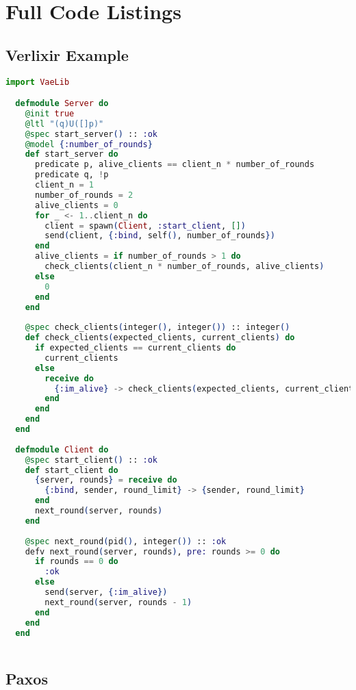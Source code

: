 \appendix \label{app:code}
\chapter{Full Code Listings}
\section{Verlixir Example}
\begin{lstlisting}[language=Elixir, xleftmargin=.1\linewidth]
  import VaeLib

  defmodule Server do
    @init true
    @ltl "(q)U([]p)"
    @spec start_server() :: :ok
    @model {:number_of_rounds}
    def start_server do
      predicate p, alive_clients == client_n * number_of_rounds
      predicate q, !p
      client_n = 1
      number_of_rounds = 2
      alive_clients = 0
      for _ <- 1..client_n do
        client = spawn(Client, :start_client, [])
        send(client, {:bind, self(), number_of_rounds})
      end
      alive_clients = if number_of_rounds > 1 do
        check_clients(client_n * number_of_rounds, alive_clients)
      else
        0
      end
    end
  
    @spec check_clients(integer(), integer()) :: integer()
    def check_clients(expected_clients, current_clients) do
      if expected_clients == current_clients do
        current_clients
      else
        receive do
          {:im_alive} -> check_clients(expected_clients, current_clients + 1)
        end
      end
    end
  end
  
  defmodule Client do
    @spec start_client() :: :ok
    def start_client do
      {server, rounds} = receive do
        {:bind, sender, round_limit} -> {sender, round_limit}
      end
      next_round(server, rounds)
    end
  
    @spec next_round(pid(), integer()) :: :ok
    defv next_round(server, rounds), pre: rounds >= 0 do
      if rounds == 0 do
        :ok
      else
        send(server, {:im_alive})
        next_round(server, rounds - 1)
      end
    end
  end
  
\end{lstlisting}

\section{Paxos}
